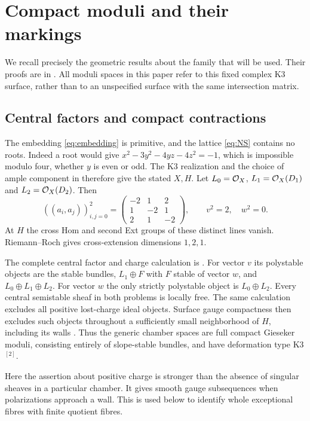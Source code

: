 \section{Compact moduli and their markings}\label{sec:geometry}

We recall precisely the geometric results about the family that will
be used. Their proofs are in \cite[\S\S4--7]{wuebben17}. All moduli
spaces in this paper refer to this fixed complex K3 surface, rather
than to an unspecified surface with the same intersection matrix.

\subsection{Central factors and compact contractions}
The embedding \eqref{eq:embedding} is primitive, and the lattice
\eqref{eq:NS} contains no roots. Indeed a root would give
$x^2-3y^2-4yz-4z^2=-1$, which is impossible modulo four, whether $y$
is even or odd. The K3 realization and the choice of ample component
in \cite[\S4.1]{wuebben17} therefore give the stated $X,H$.
Let $L_0=\mathcal O_X$, $L_1=\mathcal O_X(D_1)$ and $L_2=\mathcal O_X(D_2)$. Then
\begin{equation}\label{eq:factor-pairing}
 ((a_i,a_j))_{i,j=0}^2=
 \begin{pmatrix}-2&1&2\\1&-2&1\\2&1&-2\end{pmatrix},
 \qquad v^2=2,\quad w^2=0.
\end{equation}
At $H$ the cross Hom and second Ext groups of these distinct lines
vanish. Riemann--Roch gives cross-extension dimensions $1,2,1$.

The complete central factor and charge calculation is
\cite[Lemma~4.1]{wuebben17}. For vector $v$ its polystable objects
are the stable bundles, $L_1\oplus F$ with $F$ stable of vector $w$,
and $L_0\oplus L_1\oplus L_2$. For vector $w$ the only strictly
polystable object is $L_0\oplus L_2$. Every central semistable sheaf
in both problems is locally free. The same calculation excludes all
positive lost-charge ideal objects. Surface gauge compactness then
excludes such objects throughout a sufficiently small neighborhood
of $H$, including its walls \cite[Lemma~3.2 and \S4.2]{wuebben17}.
Thus the generic chamber spaces are full compact Gieseker moduli,
consisting entirely of slope-stable bundles, and have deformation
type K3$^{[2]}$.

Here the assertion about positive charge is stronger than the absence
of singular sheaves in a particular chamber. It gives smooth gauge
subsequences when polarizations approach a wall. This is used below
to identify whole exceptional fibres with finite quotient fibres.


